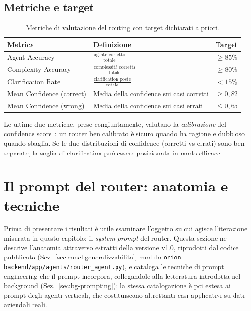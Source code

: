 \subsection{Metriche e target}
\label{subsec:eval-metriche}


\begin{table}[htbp]
  \centering
  \caption[Metriche di valutazione e target]{Metriche di valutazione del routing con target dichiarati a priori.}
  \label{tab:eval-metriche}
  \begin{tabular}{llc}
    \toprule
    \textbf{Metrica}                  & \textbf{Definizione}                              & \textbf{Target} \\
    \midrule
    Agent Accuracy                    & $\frac{\text{agente corretto}}{\text{totale}}$     & $\geq 85\%$ \\[3pt]
    Complexity Accuracy               & $\frac{\text{complessità corretta}}{\text{totale}}$ & $\geq 80\%$ \\[3pt]
    Clarification Rate                & $\frac{\text{clarification poste}}{\text{totale}}$  & $< 15\%$ \\[3pt]
    Mean Confidence (correct)         & Media della confidence sui casi corretti            & $\geq 0{,}82$ \\[3pt]
    Mean Confidence (wrong)           & Media della confidence sui casi errati              & $\leq 0{,}65$ \\
    \bottomrule
  \end{tabular}
\end{table}

Le ultime due metriche, prese congiuntamente, valutano la \emph{calibrazione} del confidence score~\cite{kadavath2022knowsknows}: 
un router ben calibrato è sicuro quando ha ragione e dubbioso quando sbaglia. 
Se le due distribuzioni di confidence (corretti vs errati) sono ben separate, la soglia di clarification può essere posizionata in modo efficace.

\section{Il prompt del router: anatomia e tecniche}
\label{sec:eval-prompteng}

Prima di presentare i risultati è utile esaminare l'oggetto su cui agisce
l'iterazione misurata in questo capitolo: il \emph{system prompt} del router.
Questa sezione ne descrive l'anatomia attraverso estratti della versione
v1.0, riprodotti dal codice pubblicato
(Sez.~\ref{sec:concl-generalizzabilita}, modulo
\texttt{orion-backend/app/agents/router\_agent.py}), e cataloga le tecniche
di prompt engineering che il prompt incorpora, collegandole alla letteratura
introdotta nel background (Sez.~\ref{sec:bg-prompting}); la stessa
catalogazione è poi estesa ai prompt degli agenti verticali, che
costituiscono altrettanti casi applicativi su dati aziendali reali.

